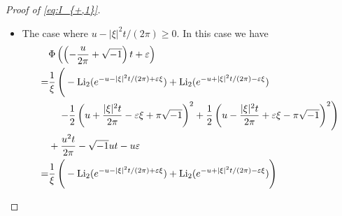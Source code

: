 \documentclass[a4paper]{amsart}
\theoremstyle{plain}
\theoremstyle{definition}
\theoremstyle{remark}
\newcommand{\Li}{\operatorname{Li}}
\renewcommand{\Re}{\operatorname{Re}}
\numberwithin{equation}{section}
\begin{document}
\begin{proof}[Proof of \eqref{eq:I_{+,1}}]
\begin{itemize}
\begin{equation*}
\begin{split}
  \right)
  \\
  &-\frac{\pi^2}{6\xi}
  -\frac{1}{2\xi}
  \left(
    u+\frac{|\xi|^2t}{2\pi}+\sqrt{-1}\pi
  \right)^2
  +\frac{u^2t}{2\pi}-\sqrt{-1}ut.
\end{split}
\end{equation*}
Since $\Li_2(z)$ is real when $z$ is real and $z<1$, we have
\begin{equation*}
\begin{split}
  &\lim_{\varepsilon\searrow0}
  \Re\Phi\left(\left(-\frac{u}{2\pi}+\sqrt{-1}\right)t+\varepsilon\right)
  \\
  =&
  -\frac{u}{|\xi|^2}
  \left(
    \Li_2(e^{-u-|\xi|^2t/(2\pi)})
    +
    \Li_2(e^{u-|\xi|^2t/(2\pi)})
  \right)
  \\
  &-\frac{u\pi^2}{6|\xi|^2}
  -\frac{u}{2|\xi|^2}
  \left(
    u+\frac{|\xi|^2t}{2\pi}
  \right)^2
  +
  \frac{u\pi^2}{2|\xi|^2}
  -
  \frac{4\pi(u+|\xi|^2t/(2\pi))\pi}{2|\xi|^2}
  +\frac{u^2t}{2\pi}
  \\
  =&
  -\frac{u}{|\xi|^2}
  \left(
    \Li_2(e^{-u-|\xi|^2t/(2\pi)})
    +
    \Li_2(e^{u-|\xi|^2t/(2\pi)})
  \right)
  \\
  &-\frac{5u\pi^2}{6|\xi|^2}
  -\frac{u^3}{2|\xi|^2}
  -\frac{u|\xi|^2t^2}{8\pi^2}
  -\pi t
  \\
  <&0
\end{split}
\end{equation*}
if $u>0$.
\item The case where $u-|\xi|^2t/(2\pi)\ge0$.
In this case we have
\begin{equation*}
\begin{split}
  &\Phi\left(\left(-\frac{u}{2\pi}+\sqrt{-1}\right)t+\varepsilon\right)
  \\
  =&
  \frac{1}{\xi}
  \left(
    \vphantom{\left(\frac{|\xi|^2t}{2\pi}\right)^2}
    -
    \Li_2(e^{-u-|\xi|^2t/(2\pi)+\varepsilon\xi})
    +
    \Li_2(e^{-u+|\xi|^2t/(2\pi)-\varepsilon\xi})
  \right.
  \\
  &\left.\quad
    -\frac{1}{2}
    \left(
      u+\frac{|\xi|^2t}{2\pi}-\varepsilon\xi+\pi\sqrt{-1}
    \right)^2
    +\frac{1}{2}
    \left(
      u-\frac{|\xi|^2t}{2\pi}+\varepsilon\xi-\pi\sqrt{-1}
    \right)^2
  \right)
  \\
  &+
  \frac{u^2t}{2\pi}-\sqrt{-1}ut-u\varepsilon
  \\
  =&
  \frac{1}{\xi}
  \left(
    \vphantom{\left(\frac{|\xi|^2t}{2\pi}\right)^2}
    -
    \Li_2(e^{-u-|\xi|^2t/(2\pi)+\varepsilon\xi})
    +
    \Li_2(e^{-u+|\xi|^2t/(2\pi)-\varepsilon\xi})
  \right)

\end{split}
\end{equation*}
\end{itemize}
\end{proof}
\end{document}
